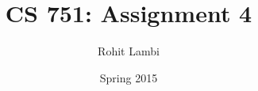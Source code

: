\documentclass[letterpaper]{report}
\begin{document}
\renewcommand{\thesection}{\arabic{section}}


\newcommand{\hmwkTitle}{Assignment\ \4}
\newcommand{\assignmentDescription}{}
\newcommand{\hmwkDueDate}{Friday,\ May 01,\ 2015} 
\newcommand{\hmwkClass}{CS\ 751} 
\newcommand{\hmwkAuthorName}{Rohit Lambi <rlambi>}


\author{Rohit Lambi}
\title{CS 751: Assignment 4 \\
\normalsize\vspace{0.1in}\large{\assignmentDescription}
}

\date{Spring 2015}

\maketitle

\tableofcontents
\newpage







%
%
\end{document}
